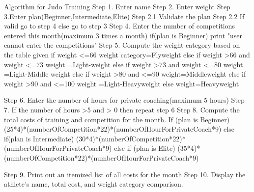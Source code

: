 Algorithm for Judo Training
Step 1. Enter name
Step 2. Enter weight
Step 3.Enter plan(Beginner,Intermediate,Elite)
	Step 2.1 Validate the plan
	Step 2.2 If valid 
		go to step 4
	     else
		go to step 3	
Step 4. Enter the number of competitions entered this month(maximum 3 times a month)
	if(plan is Beginner)
	print "user cannot enter the competitions"
Step 5. Compute the weight category based on the table given
	if weight <=66
		weight category=Flyweight
	else if weight >66 and weight <=73 
		weight =Light-weight
	else if weight >73 and weight <=80
		weight =Light-Middle weight
	else if weight >80 and <=90
		weight=Middleweight
	else if weight >90 and <=100
		weight =Light-Heavyweight
	else
		weight=Heavyweight 

Step 6. Enter the number of hours for private coaching(maximum 5 hours)				
Step 7. If the number of hours >5  and > 0 then
	repeat step 6
Step 8. Compute the total costs of training and competition for the month.
	If (plan is Beginner)
		(25*4)*(numberOfCompetition*22)*(numberOfHourForPrivateCoach*9)
	else if(plan is Intermediate)
		(30*4)*(numberOfCompetition*22)*(numberOfHourForPrivateCoach*9)
	else if (plan is Elite)
		(35*4)*(numberOfCompetition*22)*(numberOfHourForPrivateCoach*9)

Step 9. Print out an itemized list of all costs for the month
Step 10. Display the athlete's name, total cost, and weight category comparison.
